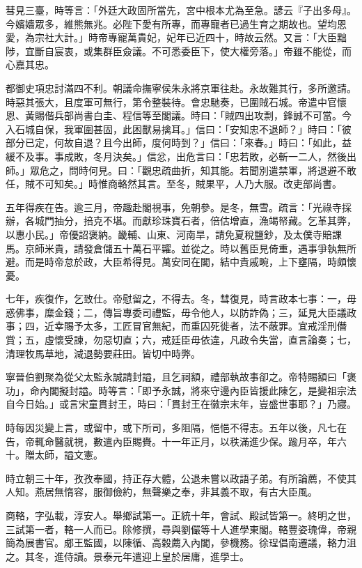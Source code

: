 \begin{pinyinscope}
彗見三臺，時等言：「外廷大政固所當先，宮中根本尤為至急。諺云『子出多母』。今嬪嬙眾多，維熊無兆。必陛下愛有所專，而專寵者已過生育之期故也。望均恩愛，為宗社大計。」時帝專寵萬貴妃，妃年已近四十，時故云然。又言：「大臣黜陟，宜斷自宸衷，或集群臣僉議。不可悉委臣下，使大權旁落。」帝雖不能從，而心嘉其忠。

都御史項忠討滿四不利。朝議命撫寧侯朱永將京軍往赴。永故難其行，多所邀請。時惡其張大，且度軍可無行，第令整裝待。會忠馳奏，已圍賊石城。帝遣中官懷恩、黃賜偕兵部尚書白圭、程信等至閣議。時曰：「賊四出攻剽，鋒誠不可當。今入石城自保，我軍圍甚固，此困獸易擒耳。」信曰：「安知忠不退師？」時曰：「彼部分已定，何故自退？且今出師，度何時到？」信曰：「來春。」時曰：「如此，益緩不及事。事成敗，冬月決矣。」信忿，出危言曰：「忠若敗，必斬一二人，然後出師。」眾危之，問時何見。曰：「觀忠疏曲折，知其能。若聞別遣禁軍，將退避不敢任，賊不可知矣。」時惟商輅然其言。至冬，賊果平，人乃大服。改吏部尚書。

五年得疾在告。逾三月，帝趣赴閣視事，免朝參。是冬，無雪。疏言：「光祿寺採辦，各城門抽分，掊克不堪。而獻珍珠寶石者，倍估增直，漁竭帑藏。乞革其弊，以惠小民。」帝優詔褒納。畿輔、山東、河南旱，請免夏稅鹽鈔，及太僕寺賠課馬。京師米貴，請發倉儲五十萬石平糶。並從之。時以舊臣見倚重，遇事爭執無所避。而是時帝怠於政，大臣希得見。萬安同在閣，結中貴戚畹，上下壅隔，時頗懷憂。

七年，疾復作，乞致仕。帝慰留之，不得去。冬，彗復見，時言政本七事：一，毋惑佛事，糜金錢；二，傳旨專委司禮監，毋令他人，以防詐偽；三，延見大臣議政事；四，近幸賜予太多，工匠冒官無紀，而重囚死徙者，法不蔽罪。宜戒淫刑僭賞；五，虛懷受諫，勿惡切直；六，戒廷臣毋依違，凡政令失當，直言論奏；七，清理牧馬草地，減退勢要莊田。皆切中時弊。

寧晉伯劉聚為從父太監永誠請封謚，且乞祠額，禮部執故事卻之。帝特賜額曰「褒功」，命內閣擬封謚。時等言：「即予永誠，將來守邊內臣皆援此陳乞，是變祖宗法自今日始。」或言宋童貫封王，時曰：「貫封王在徽宗末年，豈盛世事耶？」乃寢。

時每因災變上言，或留中，或下所司，多阻隔，悒悒不得志。五年以後，凡七在告，帝輒命醫就視，數遣內臣賜賚。十一年正月，以秩滿進少保。踰月卒，年六十。贈太師，謚文憲。

時立朝三十年，孜孜奉國，持正存大體，公退未嘗以政語子弟。有所論薦，不使其人知。燕居無惰容，服御儉約，無聲樂之奉，非其義不取，有古大臣風。

商輅，字弘載，淳安人。舉鄉試第一。正統十年，會試、殿試皆第一。終明之世，三試第一者，輅一人而已。除修撰，尋與劉儼等十人進學東閣。輅豐姿瑰偉，帝親簡為展書官。郕王監國，以陳循、高穀薦入內閣，參機務。徐珵倡南遷議，輅力沮之。其冬，進侍讀。景泰元年遣迎上皇於居庸，進學士。


\end{pinyinscope}
